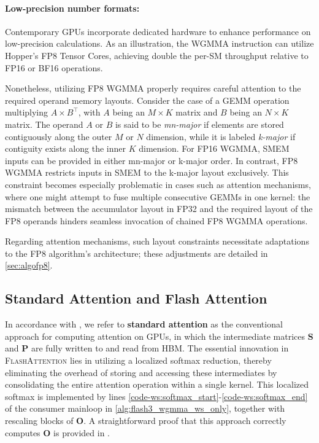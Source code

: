 \paragraph{Low-precision number formats:}
\label{sec:low-precision-gpu}
Contemporary GPUs incorporate dedicated hardware to enhance performance on low-precision calculations. As an illustration, the WGMMA instruction can utilize Hopper's FP8 Tensor Cores, achieving double the per-SM throughput relative to FP16 or BF16 operations.

Nonetheless, utilizing FP8 WGMMA properly requires careful attention to the required operand memory layouts. Consider the case of a GEMM operation multiplying $A \times B^{\top}$, with $A$ being an $M \times K$ matrix and $B$ being an $N \times K$ matrix. The operand $A$ or $B$ is said to be \emph{mn-major} if elements are stored contiguously along the outer $M$ or $N$ dimension, while it is labeled \emph{k-major} if contiguity exists along the inner $K$ dimension. For FP16 WGMMA, SMEM inputs can be provided in either mn-major or k-major order. In contrast, FP8 WGMMA restricts inputs in SMEM to the k-major layout exclusively. This constraint becomes especially problematic in cases such as attention mechanisms, where one might attempt to fuse multiple consecutive GEMMs in one kernel: the mismatch between the accumulator layout in FP32 and the required layout of the FP8 operands hinders seamless invocation of chained FP8 WGMMA operations.

Regarding attention mechanisms, such layout constraints necessitate adaptations to the FP8 algorithm’s architecture; these adjustments are detailed in \cref{sec:algofp8}.

\subsection{Standard Attention and Flash Attention} In accordance with \citet{dao2022flashattention}, we refer to \textbf{standard attention} as the conventional approach for computing attention on GPUs, in which the intermediate matrices $\mathbf{S}$ and $\mathbf{P}$ are fully written to and read from HBM. The essential innovation in \textsc{FlashAttention} lies in utilizing a localized softmax reduction, thereby eliminating the overhead of storing and accessing these intermediates by consolidating the entire attention operation within a single kernel. This localized softmax is implemented by lines \ref{code-ws:softmax_start}-\ref{code-ws:softmax_end} of the consumer mainloop in \cref{alg:flash3_wgmma_ws_only}, together with rescaling blocks of $\mathbf{O}$. A straightforward proof that this approach correctly computes $\mathbf{O}$ is provided in \cite[\S 2.3.1]{dao2023flashattention2}.


